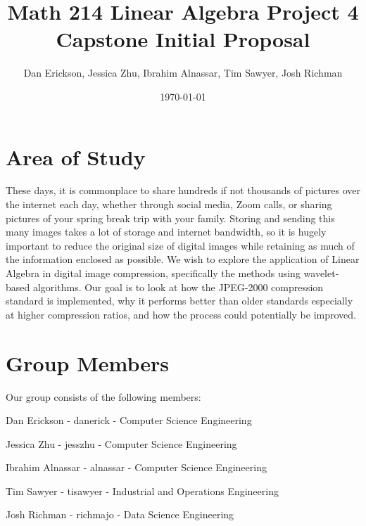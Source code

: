 \documentclass[12pt]{article}
\title{ Math 214 Linear Algebra Project 4 Capstone Initial Proposal }
\date{\today}
\author{Dan Erickson, Jessica Zhu, Ibrahim Alnassar, Tim Sawyer, Josh Richman}
\begin{document}
\maketitle

\section{Area of Study}

These days, it is commonplace to share hundreds if not thousands of pictures over the internet each day, whether through social media, Zoom calls, or sharing pictures of your spring break trip with your family. Storing and sending this many images takes a lot of storage and internet bandwidth, so it is hugely important to reduce the original size of digital images while retaining as much of the information enclosed as possible. We wish to explore the application of Linear Algebra in digital image compression, specifically the methods using wavelet-based algorithms. Our goal is to look at how the JPEG-2000 compression standard is implemented, why it performs better than older standards especially at higher compression ratios, and how the process could potentially be improved.

\section{Group Members}

Our group consists of the following members:

\begin{list}{}{}
	\item Dan Erickson - danerick - Computer Science Engineering
	\item Jessica Zhu - jesszhu - Computer Science Engineering
	\item Ibrahim Alnassar - alnassar - Computer Science Engineering
	\item Tim Sawyer - tisawyer - Industrial and Operations Engineering
	\item Josh Richman - richmajo - Data Science Engineering
\end{list}
\end{document}
